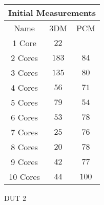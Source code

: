     \begin{tabular}{|| c | c | c ||}
    \hline
    \multicolumn{3}{||c||}{Initial Measurements} \\ [0.5ex] \hline\hline
    Name & 3DM & PCM \\\hline
    1 Core& $22$ &  \\
    2 Cores& $183$ & $84$ \\
    3 Cores& $135$ & $80$ \\
    4 Cores& $56$ & $71$ \\
    5 Cores& $79$ & $54$ \\
    6 Cores& $53$ & $78$ \\
    7 Cores& $25$ & $76$ \\
    8 Cores& $20$ & $78$ \\
    9 Cores& $42$ & $77$ \\
    10 Cores& $44$ & $100$ \\\hline
    \end{tabular}
    \caption{DUT 2}
    \label{tab:initial-measurements-exp-3-dut-2-app}
